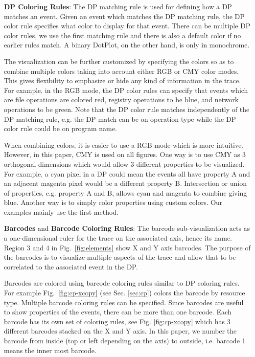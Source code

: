 {\bf DP Coloring Rules}:
The DP matching rule is used for defining how a DP matches
an event. Given an event which matches the DP matching rule,
the DP color rule specifies what color to display for that event.
There can be multiple DP color rules, we use the first matching
rule and there is also a default color if no earlier rules match.
A binary DotPlot, on the other hand, is only in monochrome.

The visualization can be further customized by specifying the colors so
as to combine multiple colors taking
into account either RGB or CMY color modes.
This gives flexibility to emphasize or hide any kind of information
in the trace.
For example, in the RGB mode, the DP color rules
can specify that events which are
file operations are colored red, 
registry operations to be blue, and network operations to be green.
Note that the DP color rule matches independently of the DP matching rule,
e.g. the DP match can be on operation type while the DP color rule could be
on program name.

When combining colors, it is easier to use a RGB mode which is
more intuitive. However, in this paper, CMY is used on all figures.
One way is to use CMY as 3 orthogonal dimensions which would allow 3 different
properties to be visualized.
For example, a cyan pixel in a DP could mean
the events all have property A and an adjacent magenta pixel 
would be a different property B. 
Intersection or union of properties, e.g. property A and B,
allows cyan and magenta to combine giving blue.
Another way is to simply color properties using custom colors.
Our examples mainly use the first method.

{\bf Barcodes} and {\bf Barcode Coloring Rules}:
The barcode sub-visualization
acts as a one-dimensional ruler for the trace on the associated axis, hence its name.
Region 3 and 4 in Fig.~\ref{fig:elements} show X and Y axis barcodes.
The purpose of the barcodes is to visualize multiple aspects of
the trace and allow that to be correlated to the associated event in the DP.

Barcodes are colored using
barcode coloring rules similar to DP coloring rules.
For example Fig.~\ref{fig:cp-xcopy} (see Sec. \ref{sec:cp})
colors the barcode by resource type.
Multiple barcode coloring rules can be specified.
Since barcodes are useful to show properties of the events,
there can be more than one barcode. Each barcode has its own
set of coloring rules, see Fig. \ref{fig:cp-xcopy} which has 3 different
barcodes stacked on the X and Y axis.
In this paper, we number the barcode from inside (top or left depending
on the axis) to outside, i.e. barcode 1 means the inner most barcode.

